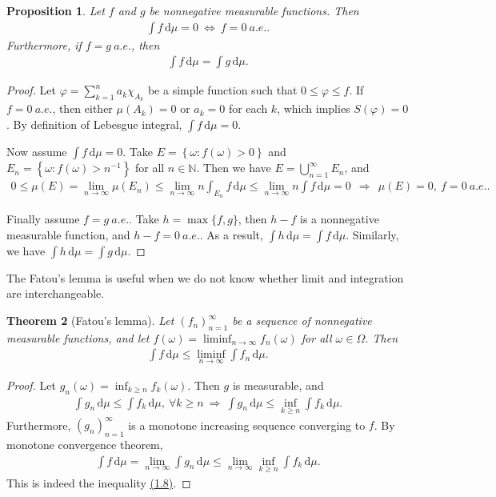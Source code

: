 \documentclass{article}
\numberwithin{equation}{section}
\renewcommand{\d}{\mathrm{d}}
\theoremstyle{plain}
\newtheorem{theorem}{Theorem}[section]
\newtheorem{proposition}[theorem]{Proposition}
\theoremstyle{definition}
\begin{document}
\begin{proposition}\label{prop:1.42} Let $f$ and $g$ be nonnegative measurable functions. Then
\begin{align*}
	\int f\,\d \mu = 0\ \Leftrightarrow\ f=0\ a.e..
\end{align*}
Furthermore, if $f=g\ a.e.$, then 
\begin{align*}
	\int f\,\d \mu = \int g\,\d \mu.
\end{align*}
\end{proposition}
\begin{proof}
Let $\varphi=\sum_{k=1}^na_k\chi_{A_k}$ be a simple function such that $0\leq\varphi\leq f$. If $f=0\ a.e.$, then either $\mu(A_k)=0$ or $a_k=0$ for each $k$, which implies $S(\varphi)=0$. By definition of Lebesgue integral, $\int f\,\d \mu=0$.\vspace{0.1cm}

Now assume $\int f\,\d \mu=0$. Take $E=\left\{\omega:f(\omega)>0\right\}$ and $E_n=\left\{\omega:f(\omega)>n^{-1}\right\}$ for all $n\in\mathbb{N}$. Then we have $E=\bigcup_{n=1}^\infty E_n$, and
\begin{align*}
	0\leq\mu(E)=\lim_{n\to\infty}\mu(E_n) \leq \lim_{n\to\infty} n\int_{E_n}f\,\d \mu \leq \lim_{n\to\infty} n\int f\,\d \mu =0\ \ \Rightarrow\ \ \mu(E)=0,\ f=0\ a.e..
\end{align*}

Finally assume $f=g\ a.e.$. Take $h=\max\{f,g\}$, then $h-f$ is a nonnegative measurable function, and $h-f=0\ a.e.$. As a result, $\int h\,\d \mu=\int f\,\d \mu$. Similarly, we have $\int h\,\d \mu=\int g\,\d \mu$.
\end{proof}

The Fatou's lemma is useful when we do not know whether limit and integration are interchangeable.

\begin{theorem}[Fatou's lemma]\label{thm:1.43} Let $(f_n)_{n=1}^\infty$ be a sequence of nonnegative measurable functions, and let $f(\omega)=\liminf_{n\to\infty} f_n(\omega)$ for all $\omega\in\Omega$. Then
\begin{align*}
	\int f\,\d \mu \leq \liminf_{n\to\infty}\int f_n\,\d \mu.\tag{1.8}\label{eq:1.8}
\end{align*}
\end{theorem}
\begin{proof}
Let $g_n(\omega)=\inf_{k\geq n} f_k(\omega)$. Then $g$ is measurable, and \begin{align*}
	\int g_n\,\d \mu\leq\int f_k\,\d \mu,\ \forall k\geq n\ \Rightarrow\ \int g_n\,\d \mu\leq\inf_{k\geq n}\int f_k\,\d \mu.
\end{align*}
Furthermore, $(g_n)_{n=1}^\infty$ is a monotone increasing sequence converging to $f$. By monotone convergence theorem,
\begin{align*}
	\int f\,\d \mu = \lim_{n\to\infty}\int g_n\,\d \mu \leq \lim_{n\to\infty} \inf_{k\geq n}\int f_k\,\d \mu.
\end{align*}
This is indeed the inequality \hyperref[eq:1.8]{(1.8)}.
\end{proof}
\end{document}
